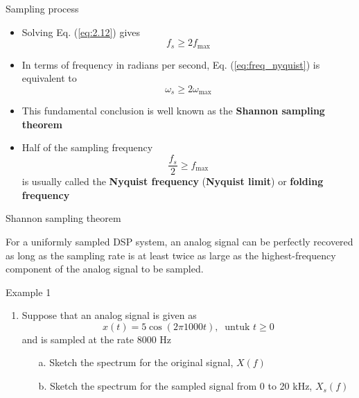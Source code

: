 \documentclass[pdflatex,compress,mathserif]{beamer}
\begin{document}
\begin{frame}{Sampling process}
    \begin{itemize}
        \item Solving Eq. (\ref{eq:2.12}) gives
        \begin{equation}
            f_s \geq 2f_{\text{max}}
            \label{eq:freq_nyquist}
        \end{equation}
        \item In terms of frequency in radians per second, Eq. (\ref{eq:freq_nyquist}) is equivalent to
        \begin{equation}
            \omega_s \geq 2\omega_{\text{max}}
        \end{equation}
        \item This fundamental conclusion is well known as the \textbf{Shannon sampling theorem}
        \item Half of the sampling frequency $$ \frac{f_s}{2} \geq f_\text{max} $$ is usually called the \textbf{Nyquist frequency} (\textbf{Nyquist limit}) or \textbf{folding frequency}
    \end{itemize} 
\end{frame}

\begin{frame}{Shannon sampling theorem}
    \begin{theorem}
        For a uniformly sampled DSP system, an analog signal can be perfectly recovered as long as the sampling rate is at least twice as large as the highest-frequency component of the analog signal to be sampled.
    \end{theorem}
\end{frame}

\begin{frame}{Example 1}
    \begin{enumerate}
        \item Suppose that an analog signal is given as
        \begin{equation*}
            x(t) = 5 \cos (2 \pi 1000 t),~\text{ untuk } t \geq 0
        \end{equation*}
        and is sampled at the rate 8000 Hz
        \begin{enumerate}
            \item[a.] Sketch the spectrum for the original signal, $X(f)$
            \item[b.] Sketch the spectrum for the sampled signal from 0 to 20 kHz, $X_s(f)$
        \end{enumerate}
    \end{enumerate}
\end{frame}
\end{document}
